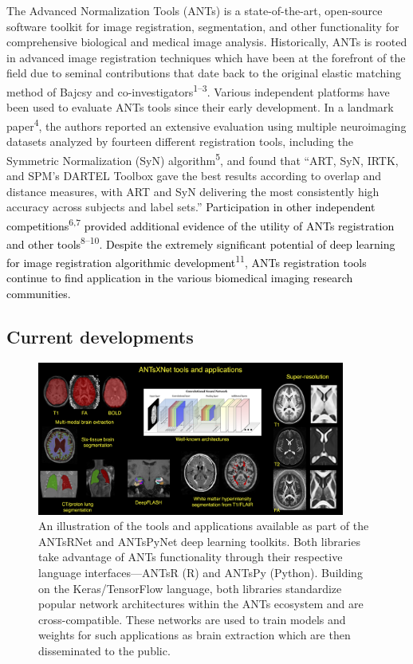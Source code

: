 \documentclass[12pt,]{article}
\begin{document}
The Advanced Normalization Tools (ANTs) is a state-of-the-art,
open-source software toolkit for image registration, segmentation, and
other functionality for comprehensive biological and medical image
analysis. Historically, ANTs is rooted in advanced image registration
techniques which have been at the forefront of the field due to seminal
contributions that date back to the original elastic matching method of
Bajcsy and co-investigators\textsuperscript{1--3}. Various independent
platforms have been used to evaluate ANTs tools since their early
development. In a landmark paper\textsuperscript{4}, the authors
reported an extensive evaluation using multiple neuroimaging datasets
analyzed by fourteen different registration tools, including the
Symmetric Normalization (SyN) algorithm\textsuperscript{5}, and found
that ``ART, SyN, IRTK, and SPM's DARTEL Toolbox gave the best results
according to overlap and distance measures, with ART and SyN delivering
the most consistently high accuracy across subjects and label sets.''
\textcolor{black}{Participation in other independent competitions}\textsuperscript{6,7}
\textcolor{black}{provided additional evidence of
the utility of ANTs registration and other tools}\textsuperscript{8--10}.
\textcolor{black}{Despite the
extremely significant potential of deep learning for image registration
algorithmic development}\textsuperscript{11},
\textcolor{black}{ANTs registration
tools continue to find application in the various biomedical imaging research
communities.}

\hypertarget{current-developments}{%
\subsection*{Current developments}\label{current-developments}}

\begin{figure}[htbp]
  \centering
    \includegraphics[width=0.9\textwidth]{Figures/coreANtsXNetTools.png}
    \caption{An illustration of the tools and applications available as part of the
    ANTsRNet and ANTsPyNet deep learning toolkits.  Both libraries take advantage
    of ANTs functionality through their respective language interfaces---ANTsR (R)
    and ANTsPy (Python).  Building on the Keras/TensorFlow language, both libraries
    standardize popular network architectures within the ANTs ecosystem and are
    cross-compatible.  These networks are used to train models and weights for such
    applications as brain extraction which are then disseminated to the public.}
 \label{fig:antsXnetTools}
 \end{figure}
\end{document}
